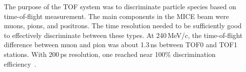 

The purpose of the TOF system was to discriminate particle species
based on time-of-flight measurement. The main components in the
MICE beam were muons, pions, and positrons. The time resolution needed
to be sufficiently good to effectively discriminate between these
types. At 240\,MeV/$c$, the time-of-flight difference between muon and
pion was about 1.3\,ns between TOF0 and TOF1 stations. With 200\,ps
resolution, one reached near 100\% discrimination efficiency~\cite{Bogomilov:2012sr}.



